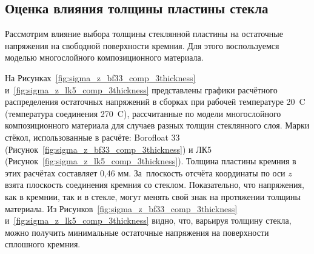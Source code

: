 \subsection{Оценка влияния толщины пластины стекла}\label{chap_optim_glass_thickness}
Рассмотрим влияние выбора толщины стеклянной пластины на остаточные напряжения на свободной поверхности кремния. Для этого воспользуемся моделью многослойного композиционного материала.

На Рисунках~\ref{fig:sigma_z_bf33_comp_3thickness} и~\ref{fig:sigma_z_lk5_comp_3thickness} представлены графики расчётного распределения остаточных напряжений в сборках при рабочей температуре 20~{\textdegree}C (температура соединения 270~{\textdegree}C), рассчитанные по модели многослойного композиционного материала для случаев разных толщин стеклянного слоя. Марки стёкол, использованные в расчёте: Borofloat 33 (Рисунок~\ref{fig:sigma_z_bf33_comp_3thickness}) и ЛК5 (Рисунок~\ref{fig:sigma_z_lk5_comp_3thickness}). Толщина пластины кремния в этих расчётах составляет 0,46 мм. За~плоскость отсчёта координаты по оси $ z $ взята плоскость соединения кремния со стеклом. Показательно, что напряжения, как в кремнии, так и в стекле, могут менять свой знак на протяжении толщины материала.
Из Рисунков~\ref{fig:sigma_z_bf33_comp_3thickness} и~\ref{fig:sigma_z_lk5_comp_3thickness} видно, что, варьируя толщину стекла, можно получить минимальные остаточные напряжения на поверхности сплошного кремния.

